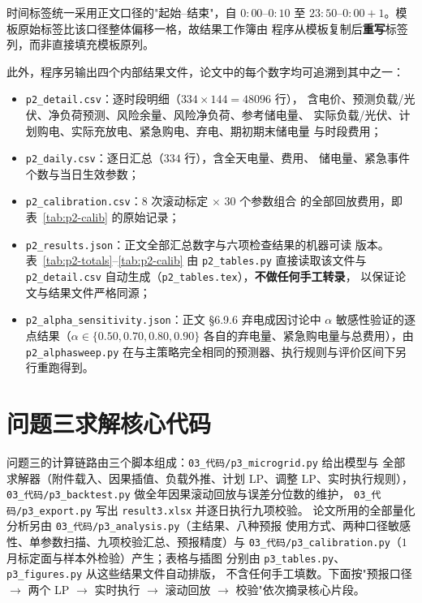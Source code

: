 \documentclass[withoutpreface,bwprint]{cumcmthesis}
\begin{document}
\begin{appendices}
时间标签统一采用正文口径的"起始--结束"，自 $0{:}00$--$0{:}10$ 至
$23{:}50$--$0{:}00{+}1$。模板原始标签比该口径整体偏移一格，故结果工作簿由
程序从模板复制后\textbf{重写}标签列，而非直接填充模板原列。

此外，程序另输出四个内部结果文件，论文中的每个数字均可追溯到其中之一：

\begin{itemize}
  \item \texttt{p2\_detail.csv}：逐时段明细（$334\times144=48096$ 行），
        含电价、预测负载/光伏、净负荷预测、风险余量、风险净负荷、参考储电量、
        实际负载/光伏、计划购电、实际充放电、紧急购电、弃电、期初期末储电量
        与时段费用；
  \item \texttt{p2\_daily.csv}：逐日汇总（$334$ 行），含全天电量、费用、
        储电量、紧急事件个数与当日生效参数；
  \item \texttt{p2\_calibration.csv}：$8$ 次滚动标定 $\times$ $30$ 个参数组合
        的全部回放费用，即表~\ref{tab:p2-calib} 的原始记录；
  \item \texttt{p2\_results.json}：正文全部汇总数字与六项检查结果的机器可读
        版本。表~\ref{tab:p2-totals}--\ref{tab:p2-calib} 由
        \texttt{p2\_tables.py} 直接读取该文件与 \texttt{p2\_detail.csv}
        自动生成（\texttt{p2\_tables.tex}），\textbf{不做任何手工转录}，
        以保证论文与结果文件严格同源；
  \item \texttt{p2\_alpha\_sensitivity.json}：正文 §6.9.6 弃电成因讨论中
        $\alpha$ 敏感性验证的逐点结果（$\alpha\in\{0.50,0.70,0.80,0.90\}$
        各自的弃电量、紧急购电量与总费用），由 \texttt{p2\_alphasweep.py}
        在与主策略完全相同的预测器、执行规则与评价区间下另行重跑得到。
\end{itemize}

\newpage
\section{问题三求解核心代码}

问题三的计算链路由三个脚本组成：\texttt{03\_代码/p3\_microgrid.py} 给出模型与
全部求解器（附件载入、因果插值、负载外推、计划 LP、调整 LP、实时执行规则），
\texttt{03\_代码/p3\_backtest.py} 做全年因果滚动回放与误差分位数的维护，
\texttt{03\_代码/p3\_export.py} 写出 \texttt{result3.xlsx} 并逐日执行九项校验。
论文所用的全部量化分析另由 \texttt{03\_代码/p3\_analysis.py}（主结果、八种预报
使用方式、两种口径敏感性、单参数扫描、九项校验汇总、预报精度）与
\texttt{03\_代码/p3\_calibration.py}（$1$ 月标定面与样本外检验）产生；表格与插图
分别由 \texttt{p3\_tables.py}、\texttt{p3\_figures.py} 从这些结果文件自动排版，
不含任何手工填数。下面按"预报口径 $\to$ 两个 LP $\to$ 实时执行 $\to$ 滚动回放
$\to$ 校验"依次摘录核心片段。


\end{appendices}
\end{document}
